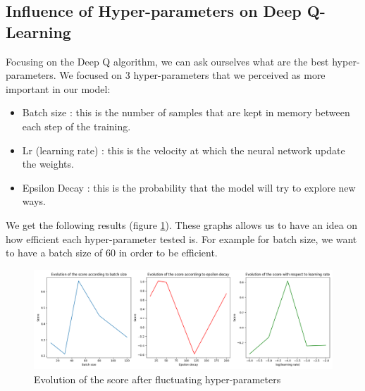 \documentclass[11pt,a4paper]{article}
\newcounter{fig}
\newcommand{\mlist}[1]{\begin{itemize}[noitemsep,topsep=0pt]#1\end{itemize}}
\begin{document}
        
		\subsection*{Influence of Hyper-parameters on Deep Q-Learning}
Focusing on the Deep Q algorithm, we can ask ourselves what are the best hyper-parameters. We focused on $3$ hyper-parameters that we perceived as more important in our model:
\mlist{
\item Batch size : this is the number of samples that are kept in memory between each step of the training. 
\item Lr (learning rate) : this is the velocity at which the neural network update the weights. 
\item Epsilon Decay : this is the probability that the model will try to explore new ways. 
}
We get the following results (figure \ref{figure:Evolution of score depending of hyper-parameter}). These graphs allows us to have an idea on how efficient each hyper-parameter tested is. For example for batch size, we want to have a batch size of $60$ in order to be efficient.
        \begin{figure}[ht]
            \centering
            \includegraphics[scale = 0.46]{comparaison2.png}
            \caption{Evolution of the score after fluctuating hyper-parameters}
            \label{figure:Evolution of score depending of hyper-parameter}
        \end{figure}
        
        
        
\end{document}
